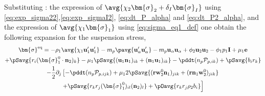 Substituting : the expression of $\avg{\chi_2\bm{\sigma}_2+ \delta_I\bm{\sigma}_I}$ using \ref{eq:exp_sigma22},\ref{eq:exp_sigmaI2}, \ref{eq:dt_P_alpha} and \ref{eq:dt_P2_alpha}, and the expression of $\avg{\chi_1\bm{\sigma}_1}$ using \ref{eq:sigma_eq1_def} one obtain the following expansion for the suspension stress,
\begin{multline*}
    \bm{\sigma}^\text{eq}
    = 
    - \rho_1 \avg{\chi_1\textbf{u}'_1\textbf{u}_1'}
    - m_p \pavg{\textbf{u}_\alpha'\textbf{u}_\alpha'}
    - m_p \textbf{u}_\alpha\textbf{u}_\alpha
    + \phi_2 \textbf{u}_2\textbf{u}_2
    - \phi_1 p_1 \textbf{I}
    + \mu_1 \textbf{e}\\
    +\pSavg{r_i (\bm{\sigma}_1^0 \cdot \textbf{n}_2)_{k}}
    - \mu_1 \pSavg{(\textbf{u}_1 \textbf{n}_1)_{ik}+(\textbf{n}_1 \textbf{u}_1)_{ik}}
    -\pddt(n_p\mathcal{P}_{p,ik})
    +\pSavg{ b_{i}r_k }\\
    - \frac{1}{2}\partial_j\left[
        - \pddt (n_p\mathcal{P}_{p,ijk})
        + \mu_1 2\pSavg{(\textbf{r}\textbf{w}_2^0 \textbf{n}_1)_{jik}+(\textbf{r}\textbf{n}_1 \textbf{w}_2^0)_{jik}}
        \right.\\ \left.
        +\pSavg{ r_{k}r_{j} (\bm{\sigma}_1^0)_{il} (\textbf{n}_2)_l }
        + \pOavg{ r_{k}r_{j}  \rho_2 b_i } 
    \right]
    \label{eq:sigma_eq}
\end{multline*}
